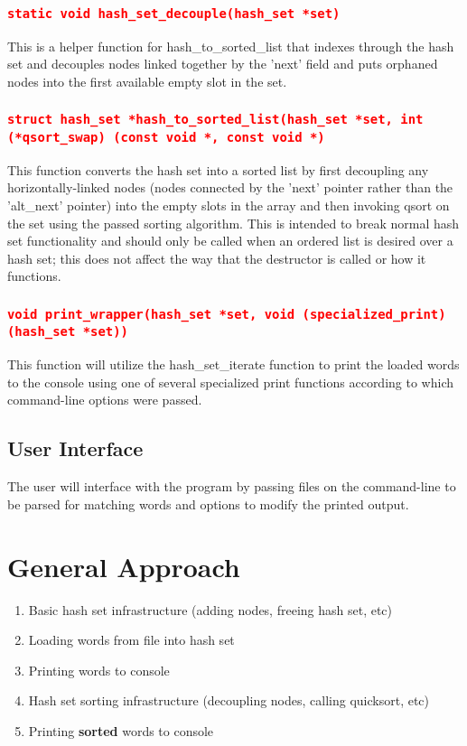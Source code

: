 \documentclass[11pt]{report}
\begin{document}
\subsubsection*{\texttt{\textcolor{red}{static void hash\_set\_decouple(hash\_set *set)}}}
This is a helper function for hash\_to\_sorted\_list that indexes through the hash set and decouples nodes linked together by the 'next' field and puts orphaned nodes into the first available empty slot in the set.
\raggedright\subsubsection*{\texttt{\textcolor{red}{struct hash\_set *hash\_to\_sorted\_list(hash\_set *set, int (*qsort\_swap) (const void *, const void *)}}}
This function converts the hash set into a sorted list by first decoupling any horizontally-linked nodes (nodes connected by the 'next' pointer rather than the 'alt\_next' pointer) into the empty slots in the array and then invoking qsort on the set using the passed sorting algorithm. This is intended to break normal hash set functionality and should only be called when an ordered list is desired over a hash set; this does not affect the way that the destructor is called or how it functions.
\raggedright\subsubsection*{\texttt{\textcolor{red}{void print\_wrapper(hash\_set *set, void (specialized\_print) (hash\_set *set))}}}
This function will utilize the hash\_set\_iterate function to print the loaded words to the console using one of several specialized print functions according to which command-line options were passed.
\pagebreak
\vspace*{\fill}
\begin{center}
\section*{User Interface}
The user will interface with the program by passing files on the command-line to be parsed for matching words and options to modify the printed output.
\end{center}
\vfill
\pagebreak
\section*{General Approach}
\begin{enumerate}
\item Basic hash set infrastructure (adding nodes, freeing hash set, etc)
\item Loading words from file into hash set
\item Printing words to console
\item Hash set sorting infrastructure (decoupling nodes, calling quicksort, etc)
\item Printing \textbf{sorted} words to console
\end{enumerate}
\end{document}
